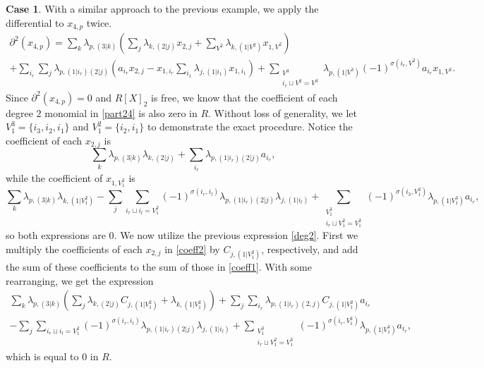 \documentclass{amsart}
\theoremstyle{definition}
\newtheorem{case}[theorem]{Case}
\theoremstyle{remark}
\begin{document}
\begin{case}
With a similar approach to the previous example, we apply the differential to $x_{4,p}$ twice. 
\begin{multline}
\label{part24}
    \partial^2(x_{4,p}) = \sum_{k} \lambda_{p,(3|k)} \left( \sum_{j} \lambda_{k,(2|j)}x_{2,j} + \sum_{V^2} \lambda_{k,(1| V^2)} x_{1,V^2}\right)\\
    + \sum_{i_r}\sum_{j} \lambda_{p,(1|i_r)(2|j)}\left(a_{i_r} x_{2,j}- x_{1,i_r} \sum_{i_1} \lambda_{j,(1|i_1)}x_{1,i_1}  \right) + \sum_{\substack{V^3 \\ i_r \sqcup V^2 = V^3}} \lambda_{p,(1|V^3)} (-1)^{\sigma(i_r,V^2)}a_{i_r}x_{1,V^2}.
    \end{multline}
Since $\partial^{2}(x_{4,p})=0$ and $R[ X ]_{2}$ is free, we know that the coefficient of each degree $2$ monomial in \cref{part24} is also zero in $R$. Without loss of generality, we let $V_1^3=\{i_3,i_2,i_1\}$ and $V^2_1=\{i_2,i_1\}$ to demonstrate the exact procedure. Notice the coefficient of each $x_{2,j}$ is 
\begin{equation}
\label{coeff2}
\sum_{k}\lambda_{p,(3|k)}\lambda_{k,(2|j)} + \sum_{i_r} \lambda_{p,(1|i_r)(2|j)}a_{i_r},
\end{equation}
while the coefficient of $x_{1,V_1^2}$ is 
\begin{equation}
\label{coeff1}
\sum_{k} \lambda_{p,(3|k)}\lambda_{k,(1|V_1^2)}-\sum_{j}\sum_{i_r\sqcup i_l=V_1^2}(-1)^{\sigma(i_r,i_l)}\lambda_{p,(1|i_r)(2|j)}\lambda_{j,(1|i_l)} + \sum_{\substack{V^3_1 \\ i_r\sqcup V_1^2= V^3_1}}(-1)^{\sigma(i_3,V^2_1)}\lambda_{p,(1|V^3_1)}a_{i_r},
\end{equation}
so both expressions are $0$.
We now utilize the previous expression \cref{deg2}. First we multiply the coefficients of each $x_{2,j}$ in \cref{coeff2} by $C_{j,(1|V^2_1)}$, respectively, and add the sum of these coefficients to the sum of those in \cref{coeff1}. With some rearranging, we get the expression
\begin{multline}
\label{deg4ex}
    \sum_{k}\lambda_{p,(3|k)}\left( \sum_j\lambda_{k,(2|j)}C_{j,(1|V^2_1)} + \lambda_{k,(1|V^2_1)}\right) + \sum_j\sum_{i_r} \lambda_{p,(1|i_r)(2,j)}C_{j,(1|V^2_1)}a_{i_r}\\
    -\sum_j\sum_{i_r\sqcup i_l=V_1^2}(-1)^{\sigma(i_r,i_l)}\lambda_{p,(1|i_r)(2|j)}\lambda_{j,(1|i_l)} + \sum_{\substack{V^3_1 \\ i_r\sqcup V_1^2= V^3_1}}(-1)^{\sigma(i_r,V^2_1)}\lambda_{p,(1|V^3_1)}a_{i_r},
\end{multline}
which is equal to $0$ in $R$.


\end{case}
\end{document}
